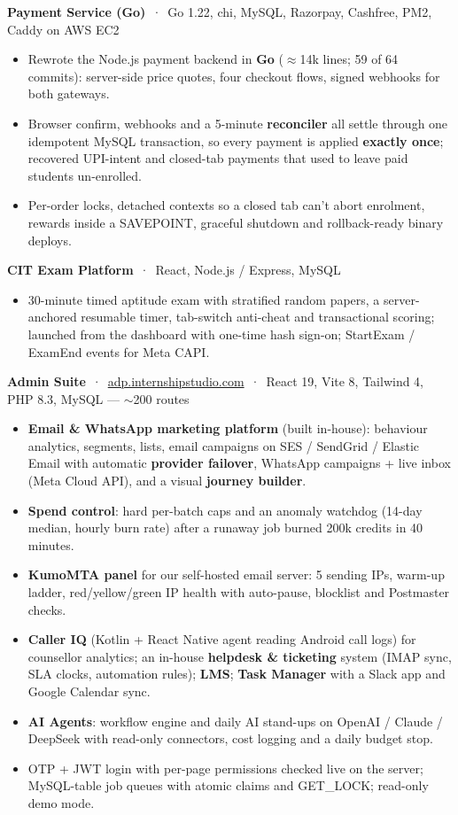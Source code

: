\documentclass[10pt,a4paper]{article}
\newcommand{\link}[2]{\href{#1}{\color{teal}#2}}
\begin{document}
\textbf{Payment Service (Go)} \,·\, {\small Go 1.22, chi, MySQL, Razorpay, Cashfree, PM2, Caddy on AWS EC2}
\begin{itemize}
  \item Rewrote the Node.js payment backend in \textbf{Go} ($\approx$14k lines; 59 of 64 commits): server-side price quotes, four checkout flows, signed webhooks for both gateways.
  \item Browser confirm, webhooks and a 5-minute \textbf{reconciler} all settle through one idempotent MySQL transaction, so every payment is applied \textbf{exactly once};
        recovered UPI-intent and closed-tab payments that used to leave paid students un-enrolled.
  \item Per-order locks, detached contexts so a closed tab can't abort enrolment, rewards inside a SAVEPOINT, graceful shutdown and rollback-ready binary deploys.
\end{itemize}

\textbf{CIT Exam Platform} \,·\, {\small React, Node.js / Express, MySQL}
\begin{itemize}
  \item 30-minute timed aptitude exam with stratified random papers, a server-anchored resumable timer, tab-switch anti-cheat and transactional scoring;
        launched from the dashboard with one-time hash sign-on; StartExam / ExamEnd events for Meta CAPI.
\end{itemize}

\textbf{Admin Suite} \,·\, \link{https://adp.internshipstudio.com}{adp.internshipstudio.com} \,·\, {\small React 19, Vite 8, Tailwind 4, PHP 8.3, MySQL --- $\sim$200 routes}
\begin{itemize}
  \item \textbf{Email \& WhatsApp marketing platform} (built in-house): behaviour analytics, segments, lists, email campaigns on SES / SendGrid / Elastic Email with automatic
        \textbf{provider failover}, WhatsApp campaigns + live inbox (Meta Cloud API), and a visual \textbf{journey builder}.
  \item \textbf{Spend control}: hard per-batch caps and an anomaly watchdog (14-day median, hourly burn rate) after a runaway job burned 200k credits in 40 minutes.
  \item \textbf{KumoMTA panel} for our self-hosted email server: 5 sending IPs, warm-up ladder, red/yellow/green IP health with auto-pause, blocklist and Postmaster checks.
  \item \textbf{Caller IQ} (Kotlin + React Native agent reading Android call logs) for counsellor analytics; an in-house \textbf{helpdesk \& ticketing} system
        (IMAP sync, SLA clocks, automation rules); \textbf{LMS}; \textbf{Task Manager} with a Slack app and Google Calendar sync.
  \item \textbf{AI Agents}: workflow engine and daily AI stand-ups on OpenAI / Claude / DeepSeek with read-only connectors, cost logging and a daily budget stop.
  \item OTP + JWT login with per-page permissions checked live on the server; MySQL-table job queues with atomic claims and GET\_LOCK; read-only demo mode.
\end{itemize}
\end{document}
